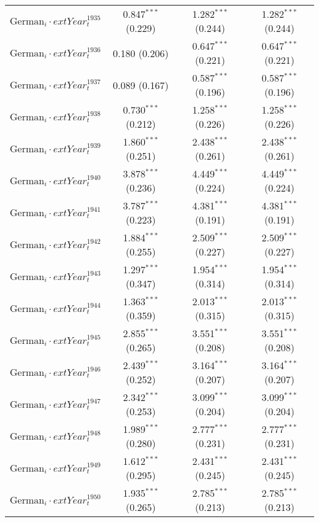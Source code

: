 \begin{table}[!h]
\begin{tabular}{@{\extracolsep{5pt}}lccc}
  $\text{German}_{i} \cdot 	ext{Year}_{t}^1935$ & 0.847$^{***}$ (0.229) & 1.282$^{***}$ (0.244) & 1.282$^{***}$ (0.244) \\ 
  $\text{German}_{i} \cdot 	ext{Year}_{t}^1936$ & 0.180 (0.206) & 0.647$^{***}$ (0.221) & 0.647$^{***}$ (0.221) \\ 
  $\text{German}_{i} \cdot 	ext{Year}_{t}^1937$ & 0.089 (0.167) & 0.587$^{***}$ (0.196) & 0.587$^{***}$ (0.196) \\ 
  $\text{German}_{i} \cdot 	ext{Year}_{t}^1938$ & 0.730$^{***}$ (0.212) & 1.258$^{***}$ (0.226) & 1.258$^{***}$ (0.226) \\ 
  $\text{German}_{i} \cdot 	ext{Year}_{t}^1939$ & 1.860$^{***}$ (0.251) & 2.438$^{***}$ (0.261) & 2.438$^{***}$ (0.261) \\ 
  $\text{German}_{i} \cdot 	ext{Year}_{t}^1940$ & 3.878$^{***}$ (0.236) & 4.449$^{***}$ (0.224) & 4.449$^{***}$ (0.224) \\ 
  $\text{German}_{i} \cdot 	ext{Year}_{t}^1941$ & 3.787$^{***}$ (0.223) & 4.381$^{***}$ (0.191) & 4.381$^{***}$ (0.191) \\ 
  $\text{German}_{i} \cdot 	ext{Year}_{t}^1942$ & 1.884$^{***}$ (0.255) & 2.509$^{***}$ (0.227) & 2.509$^{***}$ (0.227) \\ 
  $\text{German}_{i} \cdot 	ext{Year}_{t}^1943$ & 1.297$^{***}$ (0.347) & 1.954$^{***}$ (0.314) & 1.954$^{***}$ (0.314) \\ 
  $\text{German}_{i} \cdot 	ext{Year}_{t}^1944$ & 1.363$^{***}$ (0.359) & 2.013$^{***}$ (0.315) & 2.013$^{***}$ (0.315) \\ 
  $\text{German}_{i} \cdot 	ext{Year}_{t}^1945$ & 2.855$^{***}$ (0.265) & 3.551$^{***}$ (0.208) & 3.551$^{***}$ (0.208) \\ 
  $\text{German}_{i} \cdot 	ext{Year}_{t}^1946$ & 2.439$^{***}$ (0.252) & 3.164$^{***}$ (0.207) & 3.164$^{***}$ (0.207) \\ 
  $\text{German}_{i} \cdot 	ext{Year}_{t}^1947$ & 2.342$^{***}$ (0.253) & 3.099$^{***}$ (0.204) & 3.099$^{***}$ (0.204) \\ 
  $\text{German}_{i} \cdot 	ext{Year}_{t}^1948$ & 1.989$^{***}$ (0.280) & 2.777$^{***}$ (0.231) & 2.777$^{***}$ (0.231) \\ 
  $\text{German}_{i} \cdot 	ext{Year}_{t}^1949$ & 1.612$^{***}$ (0.295) & 2.431$^{***}$ (0.245) & 2.431$^{***}$ (0.245) \\ 
  $\text{German}_{i} \cdot 	ext{Year}_{t}^1950$ & 1.935$^{***}$ (0.265) & 2.785$^{***}$ (0.213) & 2.785$^{***}$ (0.213) \\ 

\end{tabular}
\end{table}
